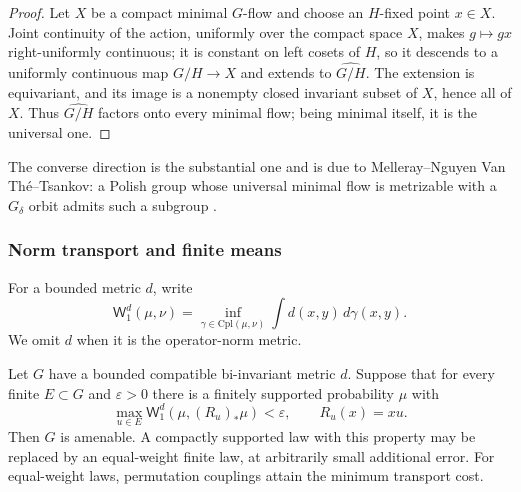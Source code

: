 \begin{proof}
Let $X$ be a compact minimal $G$-flow and choose an $H$-fixed point $x\in X$. Joint continuity of the action, uniformly over the compact space $X$,
makes $g\mapsto gx$ right-uniformly continuous; it is constant on left
cosets of $H$, so it descends to a uniformly continuous map $G/H\to X$ and
extends to $\widehat{G/H}$. The extension is equivariant, and its image is a
nonempty closed invariant subset of $X$, hence all of $X$. Thus $\widehat{G/H}$ factors onto every minimal flow; being minimal itself, it is the
universal one.
\end{proof}

The converse direction is the substantial one and is due to Melleray--Nguyen
Van Th\'e--Tsankov: a Polish group whose universal minimal flow is
metrizable with a $G_\delta$ orbit admits such a subgroup \cite[Theorem 1.2]{MNT2016}.


\subsubsection{Norm transport and finite means}

For a bounded metric $d$, write 
\begin{equation*}
\mathsf{W}_1^d(\mu,\nu)= \inf_{\gamma\in\mathrm{Cpl}(\mu,\nu)} \int
d(x,y)\,d\gamma(x,y).
\end{equation*}
We omit $d$ when it is the operator-norm metric.

\begin{lemma}\label{lem:cu-transport}
 Let $G$ have a bounded compatible bi-invariant metric $d$. Suppose that for every finite $E\subset G$ and $\varepsilon>0$ there is
a finitely supported probability $\mu$ with 
\begin{equation*}
\max_{u\in E}\mathsf{W}_1^d(\mu,(R_u)_*\mu)<\varepsilon, \qquad R_u(x)=xu.
\end{equation*}
Then $G$ is amenable. A compactly supported law with this property may be
replaced by an equal-weight finite law, at arbitrarily small additional
error. For equal-weight laws, permutation couplings attain the minimum
transport cost.
\end{lemma}

